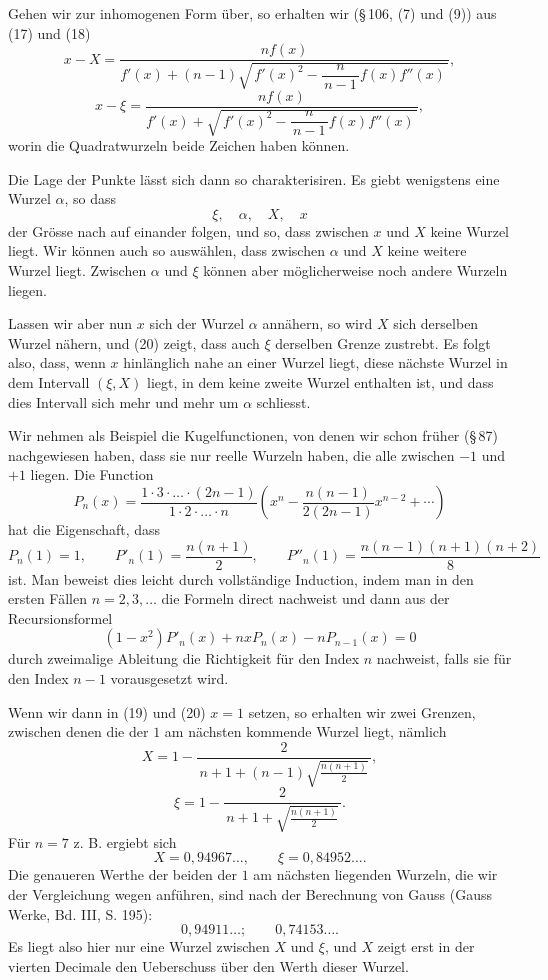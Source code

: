 \documentclass[11pt]{article}
\begin{document}
Gehen wir zur inhomogenen Form über, so erhalten wir (\S\,106, (7) und (9)) aus (17) und (18)
\begin{equation}
        x-X=\frac{n f(x)}
        {f'(x)+(n-1)\sqrt{\,f'(x)^2-\dfrac{n}{\,n-1\,}f(x)f''(x)\,}},
\tag{19}
\end{equation}
\begin{equation}
        x-\xi=\frac{n f(x)}
        {f'(x)+\sqrt{\,f'(x)^2-\dfrac{n}{\,n-1\,}f(x)f''(x)\,}},
\tag{20}
\end{equation}
worin die Quadratwurzeln beide Zeichen haben können.

Die Lage der Punkte lässt sich dann so charakterisiren. Es giebt wenigstens eine Wurzel $\alpha$, so dass
\begin{equation}
        \xi,\quad \alpha,\quad X,\quad x
\tag{21}
\end{equation}
der Grösse nach auf einander folgen, und so, dass zwischen $x$ und $X$ keine Wurzel liegt. Wir können auch so auswählen, dass zwischen $\alpha$ und $X$ keine weitere Wurzel liegt. Zwischen $\alpha$ und $\xi$ können aber möglicherweise noch andere Wurzeln liegen.

Lassen wir aber nun $x$ sich der Wurzel $\alpha$ annähern, so wird $X$ sich derselben Wurzel nähern, und (20) zeigt, dass auch $\xi$ derselben Grenze zustrebt. Es folgt also, dass, wenn $x$ hinlänglich nahe an einer Wurzel liegt, diese nächste Wurzel in dem Intervall $(\xi,X)$ liegt, in dem keine zweite Wurzel enthalten ist, und dass dies Intervall sich mehr und mehr um $\alpha$ schliesst.

Wir nehmen als Beispiel die Kugelfunctionen, von denen wir schon früher (\S\,87) nachgewiesen haben, dass sie nur reelle Wurzeln haben, die alle zwischen $-1$ und $+1$ liegen. Die Function
\[
        P_n(x)=\frac{1\cdot3\cdot\ldots\cdot(2n-1)}
        {1\cdot2\cdot\ldots\cdot n}
        \left(x^n-\frac{n(n-1)}{2(2n-1)}x^{n-2}+\cdots\right)
\]
hat die Eigenschaft, dass
\[
        P_n(1)=1,\qquad
        P'_n(1)=\frac{n(n+1)}2,\qquad
        P''_n(1)=\frac{n(n-1)(n+1)(n+2)}8
\]
ist. Man beweist dies leicht durch vollständige Induction, indem man in den ersten Fällen $n=2,3,\ldots$ die Formeln direct nachweist und dann aus der Recursionsformel
\[
        (1-x^2)P'_n(x)+nxP_n(x)-nP_{n-1}(x)=0
\]
durch zweimalige Ableitung die Richtigkeit für den Index $n$ nachweist, falls sie für den Index $n-1$ vorausgesetzt wird.

Wenn wir dann in (19) und (20) $x=1$ setzen, so erhalten wir zwei Grenzen, zwischen denen die der $1$ am nächsten kommende Wurzel liegt, nämlich
\[
        X=1-\frac{2}{\,n+1+(n-1)\sqrt{\frac{n(n+1)}2}\,},
\]
\[
        \xi=1-\frac{2}{\,n+1+\sqrt{\frac{n(n+1)}2}\,}.
\]
Für $n=7$ z. B. ergiebt sich
\[
        X=0{,}94967\ldots,\qquad \xi=0{,}84952\ldots .
\]
Die genaueren Werthe der beiden der $1$ am nächsten liegenden Wurzeln, die wir der Vergleichung wegen anführen, sind nach der Berechnung von Gauss (Gauss Werke, Bd. III, S. 195):
\[
        0{,}94911\ldots;\qquad 0{,}74153\ldots .
\]
Es liegt also hier nur eine Wurzel zwischen $X$ und $\xi$, und $X$ zeigt erst in der vierten Decimale den Ueberschuss über den Werth dieser Wurzel.
\end{document}
